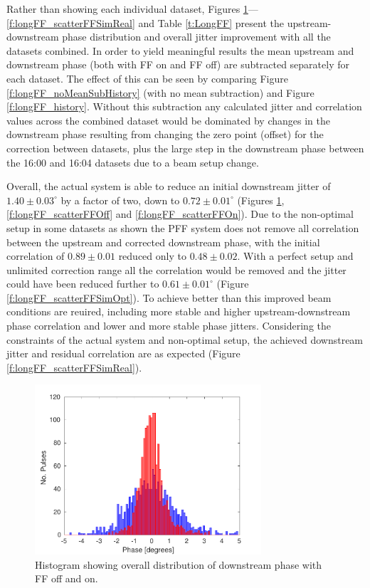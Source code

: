 Rather than showing each individual dataset, Figures 
\ref{f:longFF_histDownstreamPhase}---\ref{f:longFF_scatterFFSimReal} and Table 
\ref{t:LongFF} present the upstream-downstream phase distribution and overall jitter 
improvement with all the datasets combined. In order to yield meaningful results the 
mean upstream and downstream phase (both with FF on and FF off) are subtracted 
separately for each dataset. The effect of this can be seen by comparing Figure 
\ref{f:longFF_noMeanSubHistory} (with no mean subtraction) and Figure 
\ref{f:longFF_history}. Without this subtraction any calculated jitter and correlation 
values across the combined dataset would be dominated by changes in the downstream phase 
resulting from changing the zero point (offset) for the correction between datasets, 
plus the large step in the downstream phase between the 16:00 and 16:04 datasets due to 
a beam setup change. 



Overall, the actual system is able to reduce an initial downstream jitter of 
\(1.40\pm0.03^\circ\) by a factor of two, down to \(0.72\pm0.01^\circ\) (Figures 
\ref{f:longFF_histDownstreamPhase}, \ref{f:longFF_scatterFFOff} and 
\ref{f:longFF_scatterFFOn}). Due to the non-optimal setup in some datasets as shown the 
PFF system does not remove all correlation between the upstream and corrected downstream phase, 
with the initial correlation of \(0.89\pm0.01\) reduced only to \(0.48\pm0.02\). 
With a perfect setup and unlimited correction range all the correlation would be removed and 
the jitter could have been reduced further to \(0.61\pm0.01^\circ\) 
(Figure \ref{f:longFF_scatterFFSimOpt}). To achieve better than this improved beam 
conditions are reuired, including more stable and higher upstream-downstream phase 
correlation and lower and more stable phase jitters. Considering the constraints of the 
actual system and non-optimal setup, the achieved downstream jitter and residual 
correlation are as expected (Figure \ref{f:longFF_scatterFFSimReal}).



\begin{figure}
  \centering
  \includegraphics[width=0.75\textwidth]{Figures/feedforward/longFF_histDownstreamPhase}
  \caption{Histogram showing overall distribution of downstream phase with FF off and on.}
  \label{f:longFF_histDownstreamPhase}
\end{figure}

